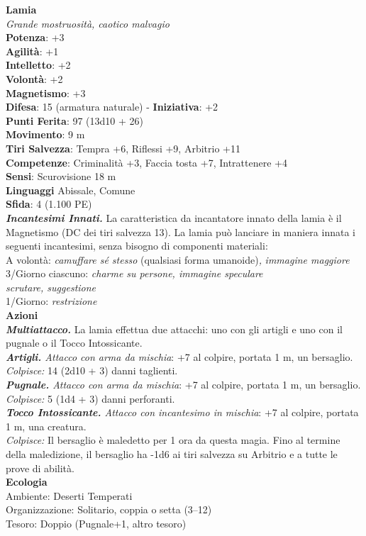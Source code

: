 \begin{multicols}{2}
\medskip\textbf{Lamia}\\
\emph{Grande mostruosità, caotico malvagio}\\
\textbf{Potenza}: +3\\
\textbf{Agilità}: +1\\
\textbf{Intelletto}: +2\\
\textbf{Volontà}: +2\\
\textbf{Magnetismo}: +3\\
\textbf{Difesa}: 15 (armatura naturale) - \textbf{Iniziativa}: +2\\
\textbf{Punti Ferita}: 97 (13d10 + 26)\\
\textbf{Movimento}: 9 m\\
\textbf{Tiri Salvezza}: Tempra +6, Riflessi +9, Arbitrio +11\\
\textbf{Competenze}: Criminalità +3, Faccia tosta +7, Intrattenere +4\\
\textbf{Sensi}: Scurovisione 18 m\\
\textbf{Linguaggi} Abissale, Comune\\
\textbf{Sfida}: 4 (1.100 PE)\smallskip\\
\emph{\textbf{Incantesimi Innati.}} La caratteristica da incantatore innato della lamia è il Magnetismo (DC dei tiri salvezza 13). La lamia può lanciare in maniera innata i seguenti incantesimi, senza bisogno di componenti materiali:\\
A volontà: \emph{camuffare sé stesso} (qualsiasi forma umanoide)\emph{,} \emph{immagine maggiore}\\
3/Giorno ciascuno: \emph{charme su persone, immagine speculare}\\
\emph{scrutare, suggestione}\\
1/Giorno: \emph{restrizione}\\
\smallskip\textbf{Azioni}\\
\emph{\textbf{Multiattacco.}} La lamia effettua due attacchi: uno con gli artigli e uno con il pugnale o il Tocco Intossicante.\\
\emph{\textbf{Artigli.} Attacco con arma da mischia}: +7 al colpire, portata 1 m, un bersaglio.\\
\emph{Colpisce:} 14 (2d10 + 3) danni taglienti.\\
\emph{\textbf{Pugnale.} Attacco con arma da mischia}: +7 al colpire, portata 1 m, un bersaglio.\\
\emph{Colpisce:} 5 (1d4 + 3) danni perforanti.\\
\emph{\textbf{Tocco Intossicante.} Attacco con incantesimo in mischia}: +7 al colpire, portata 1 m, una creatura.\\
\emph{Colpisce:} Il bersaglio è maledetto per 1 ora da questa magia. Fino al termine della maledizione, il bersaglio ha -1d6 ai tiri salvezza su Arbitrio e a tutte le prove di abilità.\\
\textbf{Ecologia}\\
Ambiente: Deserti Temperati\\
Organizzazione: Solitario, coppia o setta (3–12)\\
Tesoro: Doppio (Pugnale+1, altro tesoro)\\


\end{multicols}
